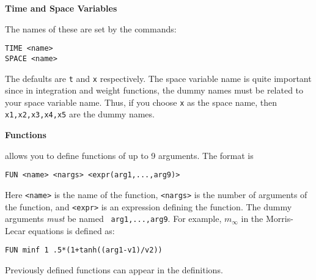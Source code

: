 \vspace{.25 in}
\begin{center}
{\bf\large Time and Space Variables}
\end{center}
The names of these are set by the commands:
\begin{verbatim}
TIME <name>
SPACE <name>
\end{verbatim}
The defaults are {\tt t} and {\tt x} respectively. The space variable
name is quite important since in integration and weight functions, the
dummy names must be related to your space variable name.  Thus, if you
choose {\tt x} as the space name, then {\tt x1,x2,x3,x4,x5} are the
dummy names.  

\vspace{.25 in}
\begin{center}
{\bf \large Functions}
\end{center}

\xtc allows you to define functions of up to 9 arguments.  The format
is
\begin{verbatim}
FUN <name> <nargs> <expr(arg1,...,arg9)>
\end{verbatim}
Here {\tt <name>} is the name of the function, {\tt <nargs>} is the
number of arguments of the function, and {\tt <expr>} is an expression
defining the function.  The dummy arguments {\it must} be named {\tt
arg1,...,arg9}.  For example, $m_\infty$ in the Morris-Lecar equations
is defined as:
\begin{verbatim}
FUN minf 1 .5*(1+tanh((arg1-v1)/v2))
\end{verbatim}
Previously defined functions can appear in the definitions.

